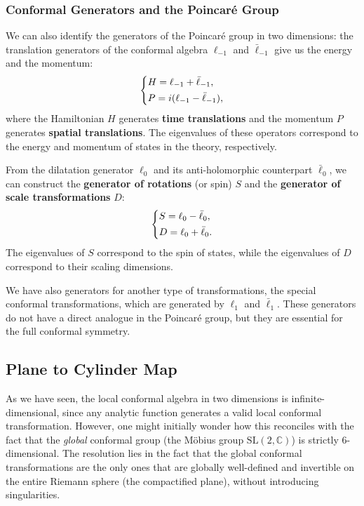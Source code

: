\subsubsection{Conformal Generators and the Poincar\'e Group}

We can also identify the generators of the Poincar\'e group in two dimensions: the translation generators of the conformal algebra \(\ell_{-1}\) and \(\bar{\ell}_{-1}\) give us the energy and the momentum:
\[
    \begin{dcases}
        H = \ell_{-1} + \bar{\ell}_{-1}, \\
        P = i(\ell_{-1} - \bar{\ell}_{-1}),
    \end{dcases}
\]
where the Hamiltonian \(H\) generates \textbf{time translations} and the momentum \(P\) generates \textbf{spatial translations}. The eigenvalues of these operators correspond to the energy and momentum of states in the theory, respectively.

From the dilatation generator \(\ell_0\) and its anti-holomorphic counterpart \(\bar{\ell}_0\), we can construct the \textbf{generator of rotations} (or spin) \(S\) and the \textbf{generator of scale transformations} \(D\):
\[
    \begin{dcases}
        S = \ell_0 - \bar{\ell}_0, \\
        D = \ell_0 + \bar{\ell}_0.
    \end{dcases}
\]
The eigenvalues of \(S\) correspond to the spin of states, while the eigenvalues of \(D\) correspond to their scaling dimensions.

We have also generators for another type of transformations, the special conformal transformations, which are generated by \(\ell_1\) and \(\bar{\ell}_1\). These generators do not have a direct analogue in the Poincar\'e group, but they are essential for the full conformal symmetry.

\subsection{Plane to Cylinder Map} \label{sec:plane_cylinder_map}

As we have seen, the local conformal algebra in two dimensions is infinite-dimensional, since any analytic function generates a valid local conformal transformation. However, one might initially wonder how this reconciles with the fact that the \textit{global} conformal group (the Möbius group $\mathrm{SL}(2,\mathbb{C})$) is strictly 6-dimensional. The resolution lies in the fact that the global conformal transformations are the only ones that are globally well-defined and invertible on the entire Riemann sphere (the compactified plane), without introducing singularities.

